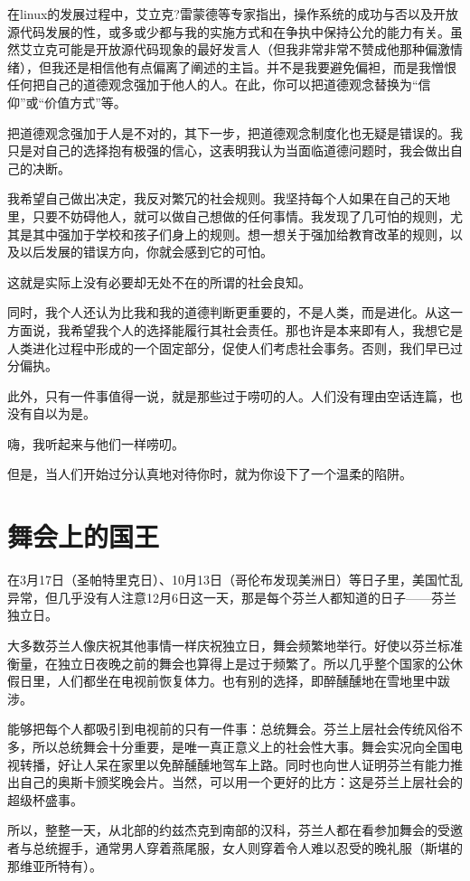 在linux的发展过程中，艾立克?雷蒙德等专家指出，操作系统的成功与否以及开放源代码发展的性，或多或少都与我的实施方式和在争执中保持公允的能力有关。虽然艾立克可能是开放源代码现象的最好发言人（但我非常非常不赞成他那种偏激情绪），但我还是相信他有点偏离了阐述的主旨。并不是我要避免偏袒，而是我憎恨任何把自己的道德观念强加于他人的人。在此，你可以把道德观念替换为“信仰”或“价值方式”等。

把道德观念强加于人是不对的，其下一步，把道德观念制度化也无疑是错误的。我只是对自己的选择抱有极强的信心，这表明我认为当面临道德问题时，我会做出自己的决断。

我希望自己做出决定，我反对繁冗的社会规则。我坚持每个人如果在自己的天地里，只要不妨碍他人，就可以做自己想做的任何事情。我发现了几可怕的规则，尤其是其中强加于学校和孩子们身上的规则。想一想关于强加给教育改革的规则，以及以后发展的错误方向，你就会感到它的可怕。

这就是实际上没有必要却无处不在的所谓的社会良知。

同时，我个人还认为比我和我的道德判断更重要的，不是人类，而是进化。从这一方面说，我希望我个人的选择能履行其社会责任。那也许是本来即有人，我想它是人类进化过程中形成的一个固定部分，促使人们考虑社会事务。否则，我们早已过分偏执。

此外，只有一件事值得一说，就是那些过于唠叨的人。人们没有理由空话连篇，也没有自以为是。

嗨，我听起来与他们一样唠叨。

但是，当人们开始过分认真地对待你时，就为你设下了一个温柔的陷阱。

 
\section{舞会上的国王}

在3月17日（圣帕特里克日）、10月13日（哥伦布发现美洲日）等日子里，美国忙乱异常，但几乎没有人注意12月6日这一天，那是每个芬兰人都知道的日子——芬兰独立日。

大多数芬兰人像庆祝其他事情一样庆祝独立日，舞会频繁地举行。好使以芬兰标准衡量，在独立日夜晚之前的舞会也算得上是过于频繁了。所以几乎整个国家的公休假日里，人们都坐在电视前恢复体力。也有别的选择，即醉醺醺地在雪地里中跋涉。

能够把每个人都吸引到电视前的只有一件事：总统舞会。芬兰上层社会传统风俗不多，所以总统舞会十分重要，是唯一真正意义上的社会性大事。舞会实况向全国电视转播，好让人呆在家里以免醉醺醺地驾车上路。同时也向世人证明芬兰有能力推出自己的奥斯卡颁奖晚会片。当然，可以用一个更好的比方：这是芬兰上层社会的超级杯盛事。

所以，整整一天，从北部的约兹杰克到南部的汉科，芬兰人都在看参加舞会的受邀者与总统握手，通常男人穿着燕尾服，女人则穿着令人难以忍受的晚礼服（斯堪的那维亚所特有）。

